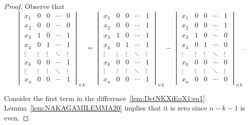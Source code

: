 \documentclass{elsarticle}
\theoremstyle{plain}
\theoremstyle{definition}
\numberwithin{equation}{section}
\begin{document}
\begin{proof}
Observe that
\begin{equation}\label{lem:DetNKXiEqX1:eq1}
\begin{vmatrix}
x_1 & 0 & 0 & \cdots & 0\\
x_2 & 0 & 0 & \cdots & 0\\
x_3 & 1 & 0 &\cdots & 1\\
x_4 & 0 & 1 &\cdots & 1\\
\vdots & \vdots & \vdots & \ddots & \vdots\\
x_k & 0 & 0 & \cdots & 1\\
\vdots & \vdots & \vdots & \ddots & \vdots\\
x_{n} & 0 & 0 & \cdots & 1
\end{vmatrix}_{n\,k} =
\begin{vmatrix}
x_1 & 0 & 0 & \cdots & 1\\
x_2 & 0 & 0 & \cdots & 1\\
x_3 & 1 & 0 &\cdots & 1\\
x_4 & 0 & 1 &\cdots & 1\\
\vdots & \vdots & \vdots & \ddots & \vdots\\
x_k & 0 & 0 & \cdots & 1\\
\vdots & \vdots & \vdots & \ddots & \vdots\\
x_{n} & 0 & 0 & \cdots & 1
\end{vmatrix}_{n\,k}
-
\begin{vmatrix}
x_1 & 0 & 0 & \cdots & 1\\
x_2 & 0 & 0 & \cdots & 1\\
x_3 & 1 & 0 &\cdots & 0\\
x_4 & 0 & 1 &\cdots & 0\\
\vdots & \vdots & \vdots & \ddots & \vdots\\
x_k & 0 & 0 & \cdots & 0\\
\vdots & \vdots & \vdots & \ddots & \vdots\\
x_{n} & 0 & 0 & \cdots & 0
\end{vmatrix}_{n\,k}.
\end{equation}

Consider the first term in the difference~\eqref{lem:DetNKXiEqX1:eq1}. Lemma~\ref{lem:NAKAGAMILEMMA20} implies that it is zero since $n - k - 1$ is even. 


\end{proof}
\end{document}

